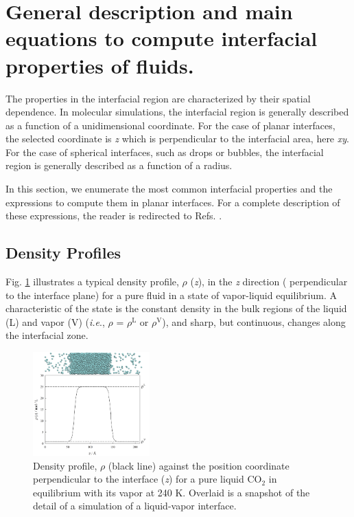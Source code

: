 \documentclass[9pt,bestpractices]{livecoms}
\begin{document}
\section{General description and main equations to compute interfacial properties of fluids.}

The properties in the interfacial region are characterized by their spatial
dependence. In molecular simulations, the interfacial region is generally
described as a function of a unidimensional coordinate. For the case of planar
interfaces, the selected coordinate is \textit{z} which is perpendicular to the
interfacial area, here \textit{xy}. For the case of spherical interfaces, such
as drops or bubbles, the interfacial region is generally described as
a function of a radius.

In this section, we enumerate the most common interfacial properties and the
expressions to compute them in planar interfaces. For a complete description of
these expressions, the reader is redirected to Refs. \citep{allen2017,gray2011}.

\subsection{Density Profiles}

Fig. \ref{fig:1} illustrates a typical density profile, ${\rho}$ (\textit{z}), in the
\textit{z} direction ( perpendicular to the interface plane) for a pure fluid
in a state of vapor-liquid equilibrium. A characteristic of the state is the
constant density in the bulk regions of the liquid (L) and vapor (V)
(\textit{i.e}., ${\rho}$ = ${\rho}$$^{\mathrm{L}}$ or ${\rho}$$^{\mathrm{V}}$),
and  sharp, but continuous, changes along the interfacial zone. 

\begin{figure}
	\centering
  \includegraphics[width=0.4\textwidth]{gfx/image1.png}
  \caption{Density profile, ${\rho}$ (black line) against the position coordinate perpendicular to the interface (\textit{z}) for a pure liquid CO$_{2}$ in equilibrium with its vapor at 240 K. Overlaid is a snapshot of the detail of a simulation of a liquid-vapor interface.}
  \label{fig:1}
\end{figure}
\end{document}

